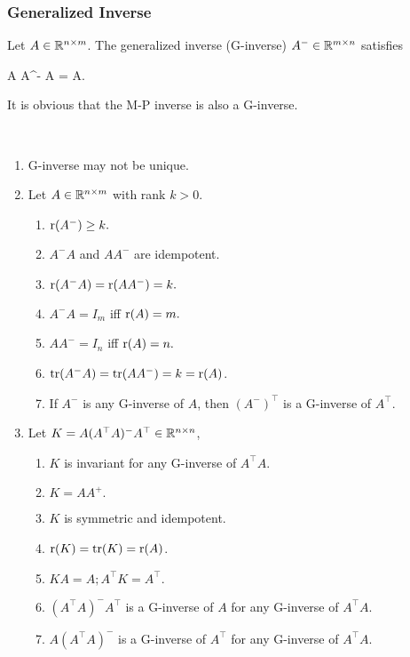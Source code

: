 \documentclass[10pt,a4paper]{book}
\begin{document}
\subsubsection{Generalized Inverse}\label{sec:gen_inv}
\begin{defbox}
	\begin{definition}\label{def:gen_inv}
		Let $A\in\mathbb R^{n\times m}$. The generalized inverse (G-inverse) $A^-\in\mathbb R^{m\times n}$ satisfies 
		\begin{sequation*}
			A A^- A = A.
		\end{sequation*}
	\end{definition}
\end{defbox}
It is obvious that the M-P inverse is also a G-inverse.

\begin{thmbox}
	\begin{theorem}\label{thm:gen_inv}
		\
		\begin{enumerate}
			\item G-inverse may not be unique.
			\item Let $A\in\mathbb R^{n\times m}$ with rank $k>0$.
			\begin{enumerate}
				\item $\mathrm{r}( A^- ) \geq k.$
				\item $A^-A$ and $AA^-$ are idempotent.
				\item $\mathrm{r}( A^- A) = \mathrm{r}( AA^- ) = k.$
				\item $A^- A= I_m$ iff $\mathrm{r}(A)=m.$
				\item $AA^-=I_n$ iff $\mathrm{r}(A)=n.$
				\item $\mathrm{tr}(A^-A)=\mathrm{tr}(AA^-)=k=\mathrm{r}(A)$.
				\item If $A^-$ is any G-inverse of $A$, then $(A^-)^\top$ is a G-inverse of $A^\top$.
			\end{enumerate}
			\item Let $K=A(A^\top A)^-A^\top\in\mathbb R^{n\times n}$,
			\begin{enumerate}
				\item $K$ is invariant for any G-inverse of $A^\top A.$
				\item $K= AA^{+ }.$ 
				\item $K$ is symmetric and idempotent. 
				\item $\mathrm{r}(K)=\mathrm{tr}(K)=\mathrm{r}(A)$.
				\item $KA=A;A^\top K=A^\top.$ 
				\item $(A^\top A)^-A^\top$ is a G-inverse of $A$ for any G-inverse of $A^\top A.$ 
				\item $A(A^\top A)^-$ is a G-inverse of $A^\top$ for any G-inverse of $A^\top A.$
			\end{enumerate}
		\end{enumerate} 
	\end{theorem}
\end{thmbox}
\end{document}
